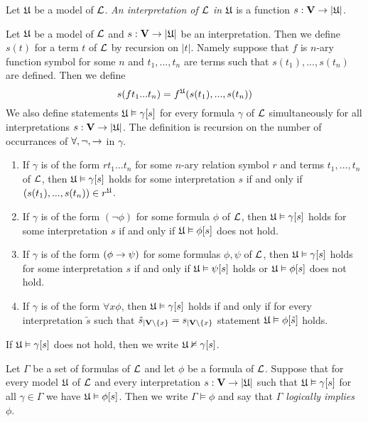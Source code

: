 \documentclass[10pt]{amsart}
\begin{document}
\begin{definition}
	Let ${\mathfrak U}$ be a model of ${\mathcal L}$. \textit{An interpretation of ${\mathcal L}$ in ${\mathfrak U}$} is a function $s:\mathbf{V}\rightarrow |{\mathfrak U}|$.
\end{definition}
\noindent
Let ${\mathfrak U}$ be a model of ${\mathcal L}$ and $s:\mathbf{V}\rightarrow |{\mathfrak U}|$ be an interpretation. Then we define $s(t)$ for a term $t$ of ${\mathcal L}$ by recursion on $|t|$. Namely suppose that $f$ is $n$-ary function symbol for some $n$ and $t_1, ..., t_n$ are terms such that $s(t_1),...,s(t_n)$ are defined. Then we define
$$s(ft_1...t_n)= f^{{\mathfrak U}}(s(t_1),...,s(t_n))$$
We also define statements ${\mathfrak U} \vDash \gamma[s]$ for every formula $\gamma$ of ${\mathcal L}$ simultaneously for all interpretations $s:\mathbf{V} \rightarrow |{\mathfrak U}|$. The definition is recursion on the number of occurrances of $\forall, \neg, \rightarrow$ in $\gamma$.
\begin{enumerate}[label=\textbf{(\arabic*)}, leftmargin=3.0em]
	\item If $\gamma$ is of the form $rt_1 ...t_n$ for some $n$-ary relation symbol $r$ and terms $t_1,...,t_n$ of ${\mathcal L}$, then ${\mathfrak U} \vDash \gamma[s]$ holds for some interpretation $s$ if and only if $\left(s(t_1),...,s(t_n)\right) \in r^{\mathfrak U}$.
	\item If $\gamma$ is of the form $(\neg \phi)$ for some formula $\phi$ of ${\mathcal L}$, then ${\mathfrak U} \vDash \gamma[s]$ holds for some interpretation $s$ if and only if ${\mathfrak U} \vDash \phi[s]$ does not hold.
	\item If $\gamma$ is of the form $(\phi \rightarrow \psi)$ for some formulas $\phi, \psi$ of ${\mathcal L}$, then ${\mathfrak U} \vDash \gamma[s]$ holds for some interpretation $s$ if and only if ${\mathfrak U} \vDash \psi[s]$ holds or ${\mathfrak U} \vDash \phi[s]$ does not hold.
	\item If $\gamma$ is of the form $\forall x \phi$, then ${\mathfrak U} \vDash \gamma[s]$ holds if and only if for every interpretation $\tilde{s}$ such that $\tilde{s}_{\mid \mathbf{V}\setminus \{x\}} = s_{\mid \mathbf{V}\setminus \{x\}}$ statement ${\mathfrak U} \vDash \phi[\tilde{s}]$ holds.
\end{enumerate}
If ${\mathfrak U} \vDash \gamma[s]$ does not hold, then we write ${\mathfrak U} \nvDash \gamma[s]$.

\begin{definition}
	Let $\Gamma$ be a set of formulas of ${\mathcal L}$ and let $\phi$ be a formula of ${\mathcal L}$. Suppose that for every model ${\mathfrak U}$ of ${\mathcal L}$ and every interpretation $s:\mathbf{V} \rightarrow |{\mathfrak U}|$ such that ${\mathfrak U} \vDash \gamma[s]$ for all $\gamma \in \Gamma$ we have ${\mathfrak U} \vDash \phi[s]$. Then we write $\Gamma \vDash \phi$ and say that \textit{$\Gamma$ logically implies $\phi$}.
\end{definition}
\end{document}
